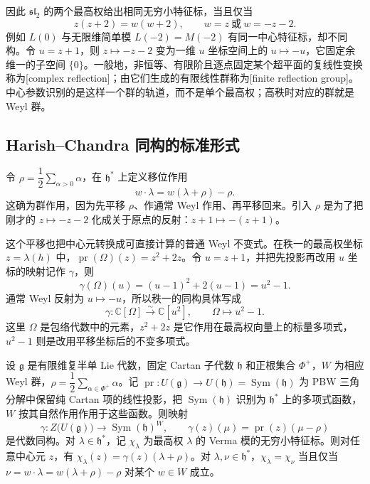 因此 \(\mathfrak{sl}_2\) 的两个最高权给出相同无穷小特征标，当且仅当
\[
	z(z+2)=w(w+2),\qquad w=z\ \text{或}\ w=-z-2.
\]
例如 \(L(0)\) 与无限维简单模 \(L(-2)=M(-2)\) 有同一中心特征标，却不同构。令 \(u=z+1\)，则 \(z\mapsto-z-2\) 变为一维 \(u\) 坐标空间上的 \(u\mapsto-u\)，它固定余维一的子空间 \(\{0\}\)。一般地，非恒等、有限阶且逐点固定某个超平面的复线性变换称为[complex reflection]；由它们生成的有限线性群称为[finite reflection group]。中心参数识别的是这样一个群的轨道，而不是单个最高权；高秩时对应的群就是 Weyl 群。

\subsection{Harish–Chandra 同构的标准形式}
\label{b5:subsec:2002:03}

令 \(\rho=\dfrac12\sum_{\alpha>0}\alpha\)，在 \(\mathfrak h^*\) 上定义移位作用
\[
	w\mathbin{\cdot}\lambda=w(\lambda+\rho)-\rho.
\]
这确为群作用，因为先平移 \(\rho\)、作通常 Weyl 作用、再平移回来。引入 \(\rho\) 是为了把刚才的 \(z\mapsto-z-2\) 化成关于原点的反射：\(z+1\mapsto-(z+1)\)。

\ProseParagraphBreak

这个平移也把中心元转换成可直接计算的普通 Weyl 不变式。在秩一的最高权坐标 \(z=\lambda(h)\) 中，\(\operatorname{pr}(\Omega)(z)=z^2+2z\)。令 \(u=z+1\)，并把先投影再改用 \(u\) 坐标的映射记作 \(\gamma\)，则
\[
	\gamma(\Omega)(u)=(u-1)^2+2(u-1)=u^2-1.
\]
通常 Weyl 反射为 \(u\mapsto-u\)，所以秩一的同构具体写成
\[
	\gamma:\mathbb C[\Omega]\xrightarrow{\sim}\mathbb C[u^2], \qquad \Omega\longmapsto u^2-1.
\]
这里 \(\Omega\) 是包络代数中的元素，\(z^2+2z\) 是它作用在最高权向量上的标量多项式，\(u^2-1\) 则是改用平移坐标后的不变多项式。

\begin{theorem}\label{b5:thm:harish-chandra}
	设 \(\mathfrak g\) 是有限维复半单 Lie 代数，固定 Cartan 子代数 \(\mathfrak h\) 和正根集合 \(\Phi^+\)，\(W\) 为相应 Weyl 群，\(\rho=\dfrac12\sum_{\alpha\in\Phi^+}\alpha\)。记 \(\operatorname{pr}:U(\mathfrak g)\to U(\mathfrak h)=\operatorname{Sym}(\mathfrak h)\) 为 PBW 三角分解中保留纯 Cartan 项的线性投影，把 \(\operatorname{Sym}(\mathfrak h)\) 识别为 \(\mathfrak h^*\) 上的多项式函数，\(W\) 按其自然作用作用于这些函数。则映射
	\[
		\gamma:Z\bigl(U(\mathfrak g)\bigr)\longrightarrow \operatorname{Sym}(\mathfrak h)^W, \qquad \gamma(z)(\mu)=\operatorname{pr}(z)(\mu-\rho)
	\]
	是代数同构。对 \(\lambda\in\mathfrak h^*\)，记 \(\chi_\lambda\) 为最高权 \(\lambda\) 的 Verma 模的无穷小特征标。则对任意中心元 \(z\)，有 \(\chi_\lambda(z)=\gamma(z)(\lambda+\rho)\)。对 \(\lambda,\nu\in\mathfrak h^*\)，\(\chi_\lambda=\chi_\nu\) 当且仅当 \(\nu=w\mathbin{\cdot}\lambda=w(\lambda+\rho)-\rho\) 对某个 \(w\in W\) 成立。
\end{theorem}

